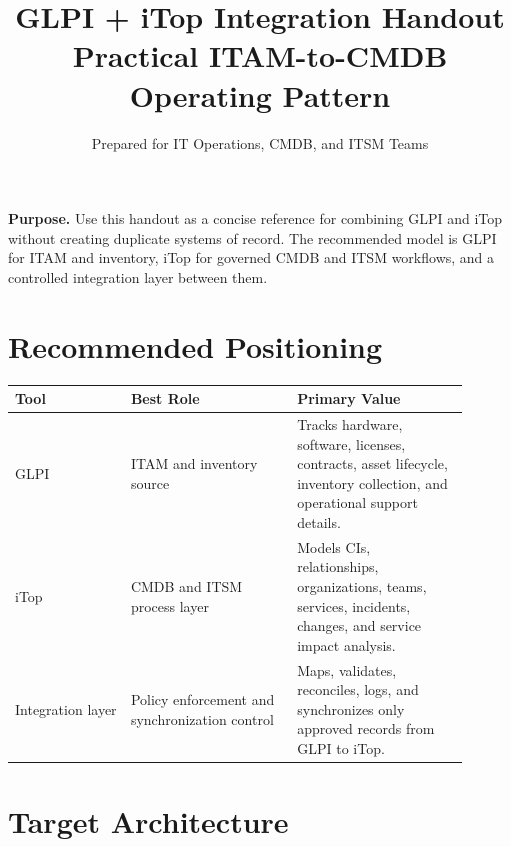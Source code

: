 \documentclass[11pt]{article}
\title{\bfseries\color{Navy} GLPI + iTop Integration Handout\\\large Practical ITAM-to-CMDB Operating Pattern}
\author{Prepared for IT Operations, CMDB, and ITSM Teams}
\date{\docversion}
\begin{document}
\maketitle
\thispagestyle{fancy}

\begin{purposebox}
\textbf{Purpose.} Use this handout as a concise reference for combining GLPI and iTop without creating duplicate systems of record. The recommended model is GLPI for ITAM and inventory, iTop for governed CMDB and ITSM workflows, and a controlled integration layer between them.
\end{purposebox}

\section{Recommended Positioning}

\begin{longtable}{>{\raggedright\arraybackslash}p{0.23\linewidth}>{\raggedright\arraybackslash}p{0.33\linewidth}>{\raggedright\arraybackslash}p{0.34\linewidth}}
\toprule
\rowcolor{LightBlue}\textbf{Tool} & \textbf{Best Role} & \textbf{Primary Value} \\
\midrule
GLPI & ITAM and inventory source & Tracks hardware, software, licenses, contracts, asset lifecycle, inventory collection, and operational support details. \\
iTop & CMDB and ITSM process layer & Models CIs, relationships, organizations, teams, services, incidents, changes, and service impact analysis. \\
Integration layer & Policy enforcement and synchronization control & Maps, validates, reconciles, logs, and synchronizes only approved records from GLPI to iTop. \\
\bottomrule
\end{longtable}

\section{Target Architecture}
\end{document}
